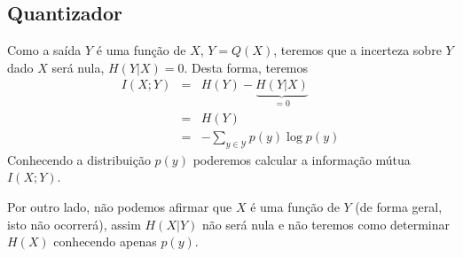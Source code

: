 \subsection{Quantizador}
% 
\begin{questions}

\begin{solution}
  Como a saída $Y$ é uma função de $X$, $Y = Q(X)$, teremos que a incerteza sobre $Y$
  dado $X$ será nula, $H(Y|X) = 0$. Desta forma, teremos
  \begin{eqnarray}
  I(X;Y) &=& H(Y) - \underbrace{H(Y|X)}_{=0} \nonumber \\
        &=& H(Y) \nonumber \\
        &=& - \sum_{y \in \mathcal{Y}} p(y) \log p(y)
  \end{eqnarray}
  Conhecendo a distribuição $p(y)$ poderemos calcular a informação mútua $I(X;Y)$.

  Por outro lado, não podemos afirmar que $X$ é uma função de $Y$ (de forma geral, isto não ocorrerá),
  assim $H(X|Y)$ não será nula e não teremos como determinar $H(X)$ conhecendo apenas $p(y)$.

\end{solution}
\end{questions}
